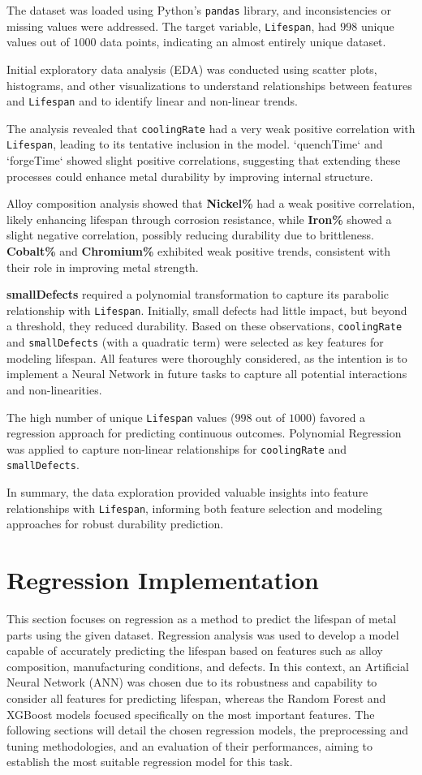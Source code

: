\documentclass{article}
\begin{document}
The dataset was loaded using Python's \texttt{pandas} library, and inconsistencies or missing values were addressed. The target variable, \texttt{Lifespan}, had $998$ unique values out of $1000$ data points, indicating an almost entirely unique dataset.

Initial exploratory data analysis (EDA) was conducted using scatter plots, histograms, and other visualizations to understand relationships between features and \texttt{Lifespan} and to identify linear and non-linear trends.

The analysis revealed that \texttt{coolingRate} had a very weak positive correlation with \texttt{Lifespan}, leading to its tentative inclusion in the model. `quenchTime` and `forgeTime` showed slight positive correlations, suggesting that extending these processes could enhance metal durability by improving internal structure.

Alloy composition analysis showed that \textbf{Nickel\%} had a weak positive correlation, likely enhancing lifespan through corrosion resistance, while \textbf{Iron\%} showed a slight negative correlation, possibly reducing durability due to brittleness. \textbf{Cobalt\%} and \textbf{Chromium\%} exhibited weak positive trends, consistent with their role in improving metal strength.

\textbf{smallDefects} required a polynomial transformation to capture its parabolic relationship with \texttt{Lifespan}. Initially, small defects had little impact, but beyond a threshold, they reduced durability. Based on these observations, \texttt{coolingRate} and \texttt{smallDefects} (with a quadratic term) were selected as key features for modeling lifespan. All features were thoroughly considered, as the intention is to implement a Neural Network in future tasks to capture all potential interactions and non-linearities.

The high number of unique \texttt{Lifespan} values ($998$ out of $1000$) favored a regression approach for predicting continuous outcomes. Polynomial Regression was applied to capture non-linear relationships for \texttt{coolingRate} and \texttt{smallDefects}.

In summary, the data exploration provided valuable insights into feature relationships with \texttt{Lifespan}, informing both feature selection and modeling approaches for robust durability prediction.
\section{Regression Implementation}
This section focuses on regression as a method to predict the lifespan of metal parts using the given dataset. Regression analysis was used to develop a model capable of accurately predicting the lifespan based on features such as alloy composition, manufacturing conditions, and defects. In this context, an Artificial Neural Network (ANN) was chosen due to its robustness and capability to consider all features for predicting lifespan, whereas the Random Forest and XGBoost models focused specifically on the most important features. The following sections will detail the chosen regression models, the preprocessing and tuning methodologies, and an evaluation of their performances, aiming to establish the most suitable regression model for this task.
\end{document}
